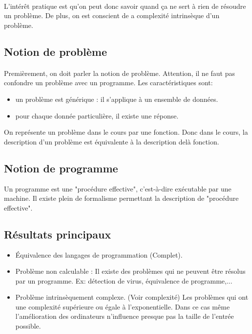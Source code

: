 \documentclass[11pt,a4paper]{article}
\begin{document}
\paragraph{}
\label{par:}
L'intérêt pratique est qu'on peut donc savoir quand ça ne sert à rien 
de résoudre un problème. De plus, on est conscient de a complexité intrinsèque d'un
problème.

\subsection{Notion de problème}
\label{subsec:notion_de_probl_me}

\paragraph{}
\label{par:}
Premièrement, on doit parler la notion de problème.
Attention, il ne faut pas confondre un problème avec un programme.
Les caractéristiques sont:

\begin{itemize}
	\item un problème est générique : il s'applique à un ensemble de données.
	\item pour chaque donnée particulière, il existe une réponse.
\end{itemize}
On représente un problème dans le cours par une fonction. Donc dans le cours,
la description d'un problème est équivalente à la description delà fonction.

\subsection{Notion de programme}
\label{ssub:notion_de_programme}

Un programme est une "procédure effective", c'est-à-dire exécutable par une machine.
Il existe plein de formalisme permettant la description de "procédure effective".


\subsection{Résultats principaux}
\label{sub:r_sultat_principaux}

\begin{itemize}
	\item Équivalence des langages de programmation (Complet).
	\item Problème non calculable : Il existe des problèmes qui ne peuvent 
		être résolus par un programme. Ex: détection de virus, équivalence
		de programme,...
	\item Problème intrinsèquement complexe. (Voir complexité) Les problèmes
		qui ont une complexité supérieure ou égale à l'exponentielle. Dans
		ce cas même l'amélioration des ordinateurs n'influence presque pas
		la taille de l'entrée possible.
\end{itemize}
\end{document}
